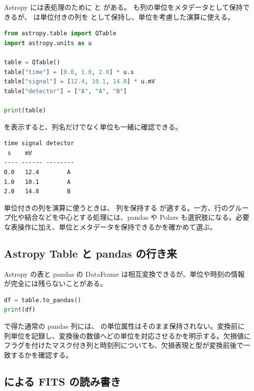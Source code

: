 Astropy には表処理のために  と  がある。 も列の単位をメタデータとして保持できるが、 は単位付きの列を  として保持し、単位を考慮した演算に使える。

\begin{lstlisting}[language=Python]
from astropy.table import QTable
import astropy.units as u

table = QTable()
table["time"] = [0.0, 1.0, 2.0] * u.s
table["signal"] = [12.4, 10.1, 14.8] * u.mV
table["detector"] = ["A", "A", "B"]

print(table)
\end{lstlisting}

 を表示すると、列名だけでなく単位も一緒に確認できる。

\begin{lstlisting}[numbers=none, xleftmargin=2\zw]
time signal detector
 s    mV
---- ------ --------
0.0   12.4        A
1.0   10.1        A
2.0   14.8        B
\end{lstlisting}

単位付きの列を演算に使うときは、 列を保持する  が適する。一方、行のグループ化や結合などを中心とする処理には、pandas や Polars も選択肢になる。必要な表操作に加え、単位とメタデータを保持できるかを確かめて選ぶ。

\subsection{Astropy Table と pandas の行き来}

Astropy の表と pandas の DataFrame は相互変換できるが、単位や時刻の情報が完全には残らないことがある。

\begin{lstlisting}[language=Python]
df = table.to_pandas()
print(df)
\end{lstlisting}

 で得た通常の pandas 列には、 の単位属性はそのまま保持されない。変換前に列単位を記録し、変換後の数値へどの単位を対応させるかを明示する。欠損値にフラグを付けたマスク付き列と時刻列についても、欠損表現と型が変換前後で一致するかを確認する。

\subsection{ による FITS の読み書き}

